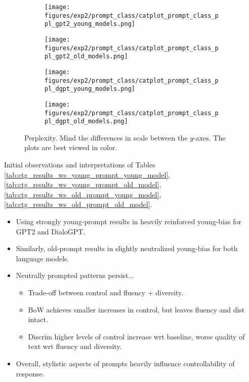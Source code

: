 \begin{figure}[H]
     \centering
     \begin{subfigure}[b]{0.48\textwidth}
        \centering
        \texttt{[image: figures/exp2/prompt\_class/catplot\_prompt\_class\_ppl\_gpt2\_young\_models.png]}
        \caption{}
        \label{subfig:catplot_prompt_class_ppl_gpt2_young}
     \end{subfigure}
     \quad
     \begin{subfigure}[b]{0.48\textwidth}
        \centering
        \texttt{[image: figures/exp2/prompt\_class/catplot\_prompt\_class\_ppl\_gpt2\_old\_models.png]}
        \caption{}
        \label{subfig:catplot_prompt_class_ppl_gpt2_old}
     \end{subfigure}
    \medskip
    \begin{subfigure}[b]{0.48\textwidth}
        \centering
        \texttt{[image: figures/exp2/prompt\_class/catplot\_prompt\_class\_ppl\_dgpt\_young\_models.png]}
        \caption{}
        \label{subfig:catplot_prompt_class_ppl_dgpt_young}
     \end{subfigure}
    \quad
     \begin{subfigure}[b]{0.48\textwidth}
        \centering
        \texttt{[image: figures/exp2/prompt\_class/catplot\_prompt\_class\_ppl\_dgpt\_old\_models.png]}
        \caption{}
        \label{subfig:catplot_prompt_class_ppl_dgpt_old}
     \end{subfigure}
    \caption{Perplexity. Mind the differences in scale between the $y$-axes. The plots are best viewed in color.}
    \label{fig:catplot_prompt_class_ppl}
\end{figure}



Initial observations and interpretations of Tables \ref{tab:ctg_results_ws_young_prompt_young_model}, \ref{tab:ctg_results_ws_young_prompt_old_model}, \ref{tab:ctg_results_ws_old_prompt_young_model}, \ref{tab:ctg_results_ws_old_prompt_old_model}.

\begin{itemize}
    \item Using strongly young-prompt results in heavily reinforced young-bias for GPT2 and DialoGPT.
    \item Similarly, old-prompt results in slightly neutralized young-bias for both language models.
    \item Neutrally prompted patterns persist...
    \begin{itemize}
        \item Trade-off between control and fluency + diversity.
        \item BoW achieves smaller increases in control, but leaves fluency and dist intact.
        \item Discrim higher levels of control increase wrt baseline, worse quality of text wrt fluency and diversity.
    \end{itemize}
    \item Overall, stylistic aspects of prompts heavily influence controllability of response.
\end{itemize}

